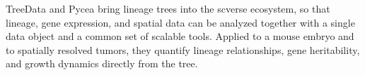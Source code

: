 TreeData and Pycea bring lineage trees into the scverse ecosystem, so that lineage, gene expression, and spatial data can be analyzed together with a single data object and a common set of scalable tools. Applied to a mouse embryo and to spatially resolved tumors, they quantify lineage relationships, gene heritability, and growth dynamics directly from the tree.
